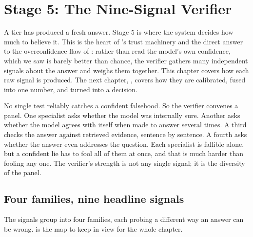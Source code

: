 \chapter{Stage 5: The Nine-Signal Verifier}
\label{ch:verifier}

A tier has produced a fresh answer. Stage 5 is where the system decides how much
to believe it. This is the heart of \caem{}'s trust machinery and the direct
answer to the overconfidence flaw of : rather than read the
model's own confidence, which we saw is barely better than chance, the verifier
gathers many independent signals about the answer and weighs them together. This
chapter covers how each raw signal is produced. The next chapter, ,
covers how they are calibrated, fused into one number, and turned into a decision.

\begin{intuition}
No single test reliably catches a confident falsehood. So the verifier convenes a
panel. One specialist asks whether the model was internally sure. Another asks
whether the model agrees with itself when made to answer several times. A third
checks the answer against retrieved evidence, sentence by sentence. A fourth asks
whether the answer even addresses the question. Each specialist is fallible alone,
but a confident lie has to fool all of them at once, and that is much harder than
fooling any one. The verifier's strength is not any single signal; it is the
diversity of the panel.
\end{intuition}

\section{Four families, nine headline signals}
\label{sec:verifier-families}

The signals group into four families, each probing a different way an answer can be
wrong.  is the map to keep in view for the whole chapter.

